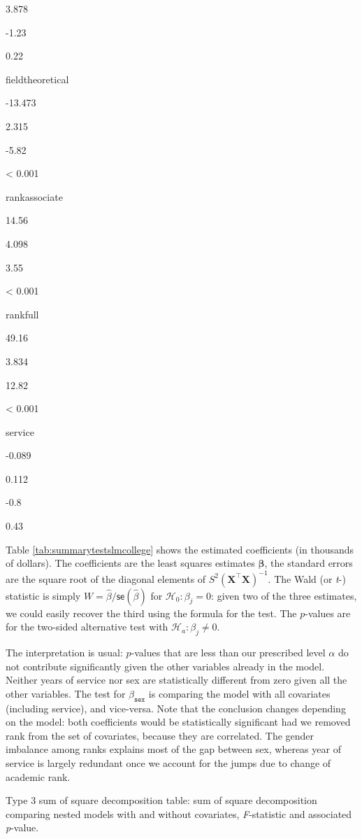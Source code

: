 \documentclass[
  11pt,
  letterpaper,
]{book}
\theoremstyle{definition}
\theoremstyle{definition}
\theoremstyle{definition}
\theoremstyle{remark}
\begin{document}
3.878

-1.23

0.22

fieldtheoretical

-13.473

2.315

-5.82

\textless{} 0.001

rankassociate

14.56

4.098

3.55

\textless{} 0.001

rankfull

49.16

3.834

12.82

\textless{} 0.001

service

-0.089

0.112

-0.8

0.43

Table \ref{tab:summarytestslmcollege} shows the estimated coefficients (in thousands of dollars). The coefficients are the least squares estimates \(\widehat{\boldsymbol{\beta}}\), the standard errors are the square root of the diagonal elements of \(S^2(\mathbf{X}^\top\mathbf{X})^{-1}\). The Wald (or \emph{t}-) statistic is simply \(W=\widehat{\beta}/\mathsf{se}(\widehat{\beta})\) for \(\mathscr{H}_0: \beta_j=0\): given two of the three estimates, we could easily recover the third using the formula for the test. The \(p\)-values are for the two-sided alternative test with \(\mathscr{H}_a: \beta_j \neq 0\).

The interpretation is usual: \(p\)-values that are less than our prescribed level \(\alpha\) do not contribute significantly given the other variables already in the model. Neither years of service nor sex are statistically different from zero given all the other variables. The test for \(\beta_{\texttt{sex}}\) is comparing the model with all covariates (including service), and vice-versa. Note that the conclusion changes depending on the model: both coefficients would be statistically significant had we removed rank from the set of covariates, because they are correlated. The gender imbalance among ranks explains most of the gap between sex, whereas year of service is largely redundant once we account for the jumps due to change of academic rank.

\label{tab:summaryanovalmcollege}Type 3 sum of square decomposition table: sum of square decomposition comparing nested models with and without covariates, \emph{F}-statistic and associated \emph{p}-value.
\end{document}
